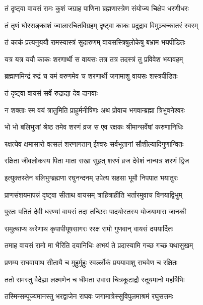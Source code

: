 \twolineshloka
{तं दृष्ट्वा वायसं रामः कुशं जग्राह पाणिना}
{ब्रह्मणास्त्रेण संयोज्य चिक्षेप धरणीधरः}%

\twolineshloka
{तं तृणं घोरसङ्काशं ज्वालारचितविग्रहम्}
{दृष्ट्वा काकः प्रदुद्राव विमुञ्चन्कातरं स्वरम्}%

\twolineshloka
{तं काकं प्रत्यनुययौ रामस्यास्त्रं सुदारुणम्}
{वायसस्त्रिषुलोकेषु बभ्राम भयपीडितः}%

\twolineshloka
{यत्र यत्र ययौ काकः शरणार्थी स वायसः}
{तत्र तत्र तदस्त्रं तु प्रविवेश भयावहम्}%

\twolineshloka
{ब्रह्माणमिन्द्रं रुद्रं च यमं वरुणमेव च}
{शरणार्थी जगामाशु वायसः शस्त्रपीडितः}%

तं दृष्ट्वा वायसं सर्वे रुद्राद्या देव दानवाः

\twolineshloka
{न शक्ताः स्म वयं त्रातुमिति प्राहुर्मनीषिणः}
{अथ प्रोवाच भगवान्ब्रह्मा त्रिभुवनेश्वरः}%


\twolineshloka
{भो भो बलिभुजां श्रेष्ठ तमेव शरणं व्रज}
{स एव रक्षकः श्रीमान्सर्वेषां करुणानिधिः}%

\twolineshloka
{रक्षत्येव क्षमासारो वत्सलं शरणागतान्}
{ईश्वरः सर्वभूतानां सौशील्यादिगुणान्वितः}%

\twolineshloka
{रक्षिता जीवलोकस्य पिता माता सखा सुहृत्}
{शरणं व्रज देवेशं नान्यत्र शरणं द्विज}%


\twolineshloka
{इत्युक्तस्तेन बलिभुग्ब्रह्मणा रघुनन्दनम्}
{उपेत्य सहसा भूमौ निपपात भयातुरः}%

\twolineshloka
{प्राणसंशयमापन्नं दृष्ट्वा सीताथ वायसम्}
{त्राहित्राहीति भर्तारमुवाच विनयाद्विभुम्}%

\twolineshloka
{पुरतः पतितं देवी धरण्यां वायसं तदा}
{तच्छिरः पादयोस्तस्य योजयामास जानकी}%

\twolineshloka
{समुत्थाप्य करेणाथ कृपापीयूषसागरः}
{ररक्ष रामो गुणवान् वायसं दययार्दितः}%

\twolineshloka
{तमाह वायसं रामो मा भैरिति दयानिधिः}
{अभयं ते प्रदास्यामि गच्छ गच्छ यथासुखम्}%

\twolineshloka
{प्रणम्य राघवायाथ सीतायै च मुहुर्मुहुः}
{स्वर्ल्लोकं प्रययावाशु राघवेण च रक्षितः}%

\twolineshloka
{ततो रामस्तु वैदेह्या लक्ष्मणेन च धीमता}
{उवास चित्रकूटाद्रौ स्तूयमानो महर्षिभिः}%

\twolineshloka
{तस्मिन्सम्पूज्यमानस्तु भरद्वाजेन राघवः}
{जगामात्रेस्सुविपुलमाश्रमं रघुसत्तमः}%

